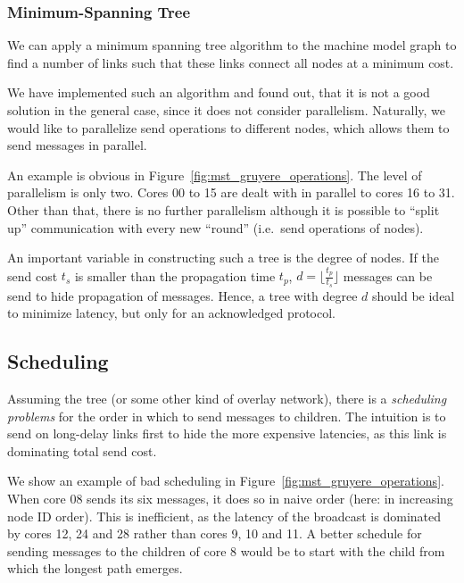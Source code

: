 \documentclass{article}
\begin{document}
\subsubsection{Minimum-Spanning Tree}

We can apply a minimum spanning tree algorithm to the machine model
graph to find a number of links such that these links connect all
nodes at a minimum cost.

We have implemented such an algorithm and found out, that it is not a
good solution in the general case, since it does not consider
parallelism. Naturally, we would like to parallelize send operations
to different nodes, which allows them to send messages in parallel. 

An example is obvious in Figure~\ref{fig:mst_gruyere_operations}. The
level of parallelism is only two. Cores 00 to 15 are dealt with in
parallel to cores 16 to 31. Other than that, there is no further
parallelism although it is possible to ``split up'' communication with
every new ``round'' (i.e.\ send operations of nodes).

An important variable in constructing such a tree is the degree of
nodes. If the send cost $t_s$ is smaller than the propagation time
$t_p$,  $d = \lfloor \frac{t_p}{t_s} \rfloor$ messages can be send to
hide propagation of messages. Hence, a tree with degree $d$ should be
ideal to minimize latency, but only for an acknowledged protocol.

\subsection{Scheduling}

Assuming the tree (or some other kind of overlay network), there is a
\emph{scheduling problems} for the order in which to send messages to
children. The intuition is to send on long-delay links first to hide
the more expensive latencies, as this link is dominating total send
cost.

We show an example of bad scheduling in
Figure~\ref{fig:mst_gruyere_operations}. When core 08 sends its six
messages, it does so in naive order (here: in increasing node ID
order). This is inefficient, as the latency of the broadcast is
dominated by cores 12, 24 and 28 rather than cores 9, 10 and 11. A
better schedule for sending messages to the children of core 8 would
be to start with the child from which the longest path emerges.
\end{document}
